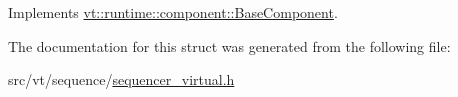 Implements \hyperlink{structvt_1_1runtime_1_1component_1_1_base_component_a7701485f3539f78d42e6bad47fc7eb78}{vt\+::runtime\+::component\+::\+Base\+Component}.



The documentation for this struct was generated from the following file\+:\begin{DoxyCompactItemize}
\item 
src/vt/sequence/\hyperlink{sequencer__virtual_8h}{sequencer\+\_\+virtual.\+h}\end{DoxyCompactItemize}
